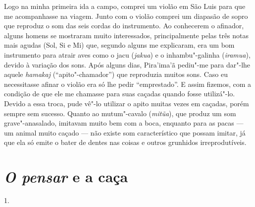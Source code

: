 Logo na minha primeira ida a campo, comprei um violão em São Luis para
que me acompanhasse na viagem. Junto com o violão comprei um diapasão de
sopro que reproduz o som das seis cordas do instrumento. Ao conhecerem o
afinador, alguns homens se mostraram muito interessados, principalmente
pelas três notas mais agudas (Sol, Si e Mi) que, segundo alguns me
explicaram, era um bom instrumento para atrair aves como o jacu
(\emph{jakua}) e o inhambu"-galinha (\emph{iramua}), devido à variação
dos sons. Após alguns dias, Pira'ima'ã pediu"-me para dar"-lhe aquele
\emph{hamakaj} (``apito"-chamador'') que reproduzia muitos sons. Caso eu
necessitasse afinar o violão era só lhe pedir ``emprestado''. E assim
fizemos, com a condição de que ele me chamasse para suas caçadas quando
fosse utilizá"-lo. Devido a essa troca, pude vê"-lo utilizar o apito
muitas vezes em caçadas, porém sempre sem sucesso. Quanto ao
mutum"-cavalo (\emph{mitũa}), que produz um som grave"-anasalado, imitavam
muito bem com a boca, enquanto para as pacas --- um animal muito caçado ---
não existe som característico que possam imitar, já que ela só emite o
bater de dentes nas coisas e outros grunhidos irreprodutíveis.

\section{\emph{O pensar} e a caça}

1.

